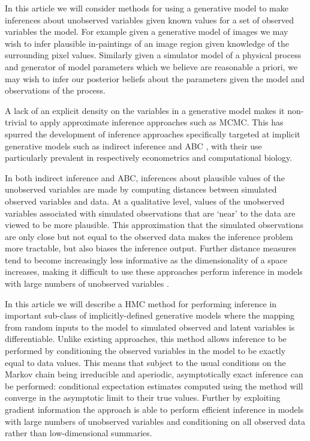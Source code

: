 In this article we will consider methods for using a generative model to make inferences about unobserved variables given known values for a set of observed variables the model. For example given a generative model of images we may wish to infer plausible in-paintings of an image region given knowledge of the surrounding pixel values. Similarly given a simulator model of a physical process and generator of model parameters which we believe are reasonable a priori, we may wish to infer our posterior beliefs about the parameters given the model and observations of the process.

A lack of an explicit density on the variables in a generative model makes it non-trivial to apply approximate inference approaches such as \ac{MCMC}. This has spurred the development of inference approaches specifically targeted at implicit generative models such as indirect inference \citep{gourieroux1993indirect} and \ac{ABC} \citep{beaumont2002approximate}, with their use particularly prevalent in respectively econometrics and computational biology.

In both indirect inference and \ac{ABC}, inferences about plausible values of the unobserved variables are made by computing distances between simulated observed variables and data. At a qualitative level, values of the unobserved variables associated with simulated observations that are `near' to the data are viewed to be more plausible. This approximation that the simulated observations are only close but not equal to the observed data makes the inference problem more tractable, but also biases the inference output. Further distance measures tend to become increasingly less informative as the dimensionality of a space increases, making it difficult to use these approaches perform inference in models with large numbers of unobserved variables \citep{marin2012approximate}.

In this article we will describe a \ac{HMC} \citep{duane1987hybrid,mackay2003information} method for performing inference in important sub-class of implicitly-defined generative models where the mapping from random inputs to the model to simulated observed and latent variables is differentiable. Unlike existing approaches, this method allows inference to be performed by conditioning the observed variables in the model to be exactly equal to data values. This means that subject to the usual conditions on the Markov chain being irreducible and aperiodic, asymptotically exact inference can be performed: conditional expectation estimates computed using the method will converge in the asymptotic limit to their true values. Further by exploiting gradient information the approach is able to perform efficient inference in models with large numbers of unobserved variables and conditioning on all observed data rather than low-dimensional summaries.


